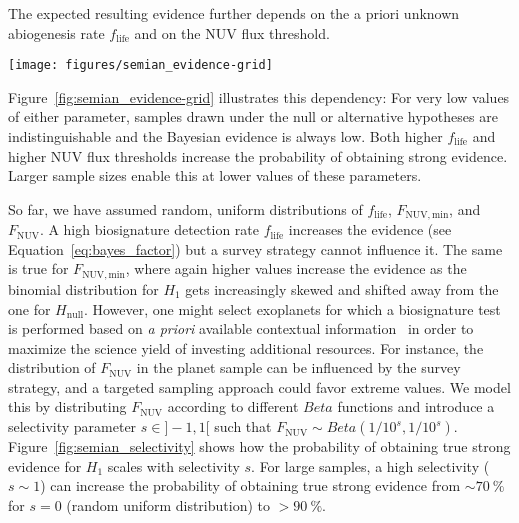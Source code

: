 \documentclass[twocolumn,twocolappendix,linenumbers]{aastex631}
\begin{document}
The expected resulting evidence further depends on the a priori unknown abiogenesis rate $f_\mathrm{life}$ and on the \gls{NUV} flux threshold.
\begin{figure*}
    \begin{centering}
        \texttt{[image: figures/semian\_evidence-grid]}
        \caption{Probability of obtaining true strong evidence for different abiogenesis rates, \gls{NUV} flux thresholds, and sample sizes. For each of these parameters, higher values increase the probability of yielding strong evidence.}
        \label{fig:semian_evidence-grid}
    \end{centering}
\end{figure*}
Figure~\ref{fig:semian_evidence-grid} illustrates this dependency: For very low values of either parameter, samples drawn under the null or alternative hypotheses are indistinguishable and the Bayesian evidence is always low.
Both higher $f_\mathrm{life}$ and higher \gls{NUV} flux thresholds increase the probability of obtaining strong evidence.
Larger sample sizes enable this at lower values of these parameters.


So far, we have assumed random, uniform distributions of $f_\mathrm{life}$, $F_\mathrm{NUV, min}$, and $F_\mathrm{NUV}$. %
A high biosignature detection rate $f_\mathrm{life}$ increases the evidence (see Equation~\ref{eq:bayes_factor}) but a survey strategy cannot influence it.
The same is true for $F_\mathrm{NUV, min}$, where again higher values increase the evidence as the binomial distribution for $H_\mathrm{1}$ gets increasingly skewed and shifted away from the one for $H_\mathrm{null}$.
However, one might select exoplanets for which a biosignature test is performed based on \textit{a priori} available contextual information~\citep{catling2018exoplanet} in order to maximize the science yield of investing additional resources.
For instance, the distribution of $F_\mathrm{NUV}$ in the planet sample can be influenced by the survey strategy, and a targeted sampling approach could favor extreme values. %
We model this by distributing $F_\mathrm{NUV}$ according to different $Beta$ functions and introduce a selectivity parameter $s\in]-1,1[$ such that $F_\mathrm{NUV} \sim Beta(1/10^s,1/10^s)$.
Figure~\ref{fig:semian_selectivity} shows how the probability of obtaining true strong evidence for $H_\mathrm{1}$ scales with selectivity $s$.
For large samples, a high selectivity ($s \sim 1$) can increase the probability of obtaining true strong evidence from $\sim \SI{70}{\percent}$ for $s= 0$ (random uniform distribution) to $> \SI{90}{\percent}$.
\end{document}
